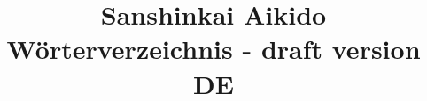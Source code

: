 \documentclass{memoir}
\begin{document}
\title{Sanshinkai Aikido Wörterverzeichnis - draft version DE}
\maketitle


\end{document}
